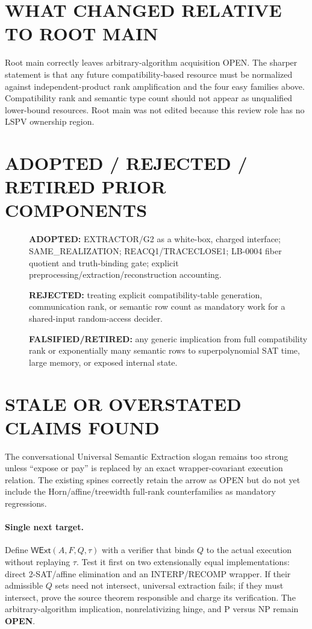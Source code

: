 \documentclass[11pt]{article}
\begin{document}
\section{WHAT CHANGED RELATIVE TO ROOT MAIN}
Root main correctly leaves arbitrary-algorithm acquisition OPEN.  The sharper
statement is that any future compatibility-based resource must be normalized
against independent-product rank amplification and the four easy families
above.  Compatibility rank and semantic type count should not appear as
unqualified lower-bound resources.  Root main was not edited because this
review role has no LSPV ownership region.

\section{ADOPTED / REJECTED / RETIRED PRIOR COMPONENTS}
\begin{description}
\item[] \textbf{ADOPTED:} EXTRACTOR/G2 as a white-box, charged interface;
SAME\_REALIZATION; REACQ1/TRACECLOSE1; LB-0004 fiber quotient and truth-binding
gate; explicit preprocessing/extraction/reconstruction accounting.
\item[] \textbf{REJECTED:} treating explicit compatibility-table generation,
communication rank, or semantic row count as mandatory work for a shared-input
random-access decider.
\item[] \textbf{FALSIFIED/RETIRED:} any generic implication from full
compatibility rank or exponentially many semantic rows to superpolynomial
SAT time, large memory, or exposed internal state.
\end{description}

\section{STALE OR OVERSTATED CLAIMS FOUND}
The conversational Universal Semantic Extraction slogan remains too strong
unless ``expose or pay'' is replaced by an exact wrapper-covariant execution
relation.  The existing spines correctly retain the arrow as OPEN but do not
yet include the Horn/affine/treewidth full-rank counterfamilies as mandatory
regressions.

\paragraph{Single next target.}
Define $\mathsf{WExt}(A,F,Q,\tau)$ with a verifier that binds $Q$ to the actual
execution without replaying $\tau$.  Test it first on two extensionally equal
implementations: direct 2-SAT/affine elimination and an INTERP/RECOMP wrapper.
If their admissible $Q$ sets need not intersect, universal extraction fails;
if they must intersect, prove the source theorem responsible and charge its
verification.  The arbitrary-algorithm implication, nonrelativizing hinge,
and P versus NP remain \textbf{OPEN}.
\end{document}

